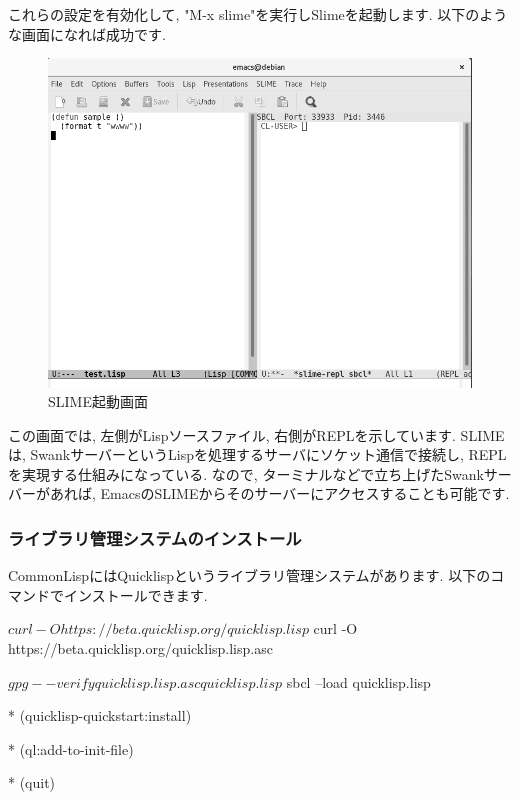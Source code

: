 \documentclass[mingoth,a4paper]{jsarticle}
\begin{document}
これらの設定を有効化して, "M-x slime"を実行しSlimeを起動します. 以下のような画面になれば成功です. 

\begin{figure}[htbp!]
\centering
\includegraphics[width=\linewidth]{image201709-kansai/run-slime_gray.png}
\caption{SLIME起動画面}
\end{figure}

この画面では, 左側がLispソースファイル, 右側がREPLを示しています. 
SLIMEは, SwankサーバーというLispを処理するサーバにソケット通信で接続し, REPLを実現する仕組みになっている. なので, ターミナルなどで立ち上げたSwankサーバーがあれば, EmacsのSLIMEからそのサーバーにアクセスすることも可能です. 

\subsubsection{ライブラリ管理システムのインストール}

CommonLispにはQuicklispというライブラリ管理システムがあります. 以下のコマンドでインストールできます. 

\begin{commandline}
$ curl -O https://beta.quicklisp.org/quicklisp.lisp

$ curl -O https://beta.quicklisp.org/quicklisp.lisp.asc

$ gpg --verify quicklisp.lisp.asc quicklisp.lisp

$ sbcl --load quicklisp.lisp

* (quicklisp-quickstart:install)

* (ql:add-to-init-file)

* (quit)
\end{commandline}
\end{document}
